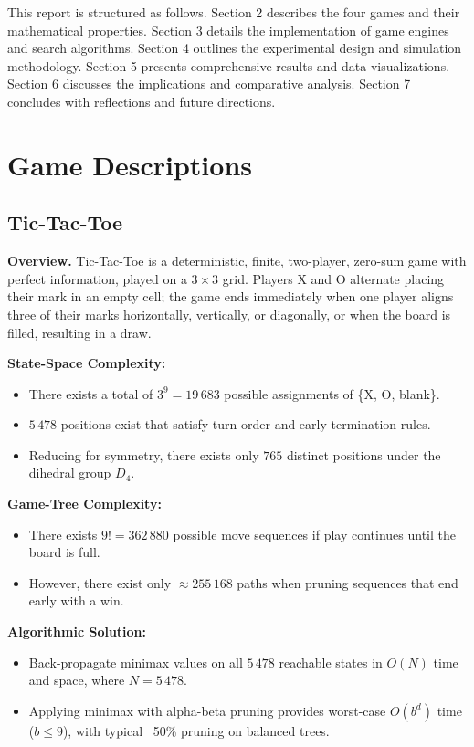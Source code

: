 \documentclass[12pt]{article}
\begin{document}
This report is structured as follows. Section 2 describes the four games and their mathematical properties. Section 3 details the implementation of game engines and search algorithms. Section 4 outlines the experimental design and simulation methodology. Section 5 presents comprehensive results and data visualizations. Section 6 discusses the implications and comparative analysis. Section 7 concludes with reflections and future directions.
\section{Game Descriptions}

\subsection{Tic-Tac-Toe}

\textbf{Overview.}  
Tic-Tac-Toe is a deterministic, finite, two-player, zero-sum game with perfect information, played on a $3\times3$ grid. Players X and O alternate placing their mark in an empty cell; the game ends immediately when one player aligns three of their marks horizontally, vertically, or diagonally, or when the board is filled, resulting in a draw.

\vspace{1em}

\noindent\textbf{State-Space Complexity:}
\begin{itemize}
  \item There exists a total of $3^9 = 19\,683$ possible assignments of \{X, O, blank\}.
  \item  $5\,478$ positions exist that satisfy turn-order and early termination rules.
  \item Reducing for symmetry, there exists only $765$ distinct positions under the dihedral group $D_4$.
\end{itemize}

\noindent\textbf{Game-Tree Complexity:}
\begin{itemize}
  \item There exists $9! = 362\,880$ possible move sequences if play continues until the board is full.
  \item However, there exist only $\approx255\,168$ paths when pruning sequences that end early with a win.
\end{itemize}

\noindent\textbf{Algorithmic Solution:}
\begin{itemize}
  \item Back-propagate minimax values on all $5\,478$ reachable states in $O(N)$ time and space, where $N=5\,478$.
  \item Applying minimax with alpha-beta pruning provides worst-case $O(b^d)$ time ($b\le9$), with typical ~50\% pruning on balanced trees.
\end{itemize}
\end{document}
